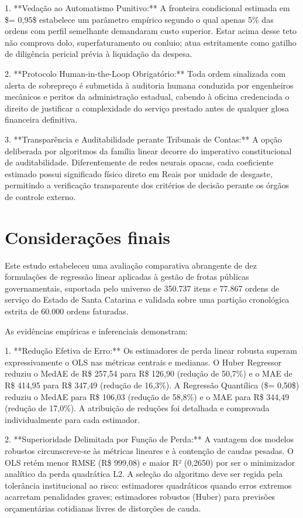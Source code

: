 \documentclass[12pt,a4paper]{article}
\begin{document}
1. **Vedação ao Automatismo Punitivo:** A fronteira condicional estimada em \$\tau = 0,95\$ estabelece um parâmetro empírico segundo o qual apenas 5\% das ordens com perfil semelhante demandaram custo superior. Estar acima desse teto não comprova dolo, superfaturamento ou conluio; atua estritamente como gatilho de diligência pericial prévia à liquidação da despesa.

2. **Protocolo Human-in-the-Loop Obrigatório:** Toda ordem sinalizada com alerta de sobrepreço é submetida à auditoria humana conduzida por engenheiros mecânicos e peritos da administração estadual, cabendo à oficina credenciada o direito de justificar a complexidade do serviço prestado antes de qualquer glosa financeira definitiva.

3. **Transparência e Auditabilidade perante Tribunais de Contas:** A opção deliberada por algoritmos da família linear decorre do imperativo constitucional de auditabilidade. Diferentemente de redes neurais opacas, cada coeficiente estimado possui significado físico direto em Reais por unidade de desgaste, permitindo a verificação transparente dos critérios de decisão perante os órgãos de controle externo.


\section{Considerações finais}

Este estudo estabeleceu uma avaliação comparativa abrangente de dez formulações de regressão linear aplicadas à gestão de frotas públicas governamentais, suportada pelo universo de 350.737 itens e 77.867 ordens de serviço do Estado de Santa Catarina e validada sobre uma partição cronológica estrita de 60.000 ordens faturadas.

As evidências empíricas e inferenciais demonstram:

1. **Redução Efetiva de Erro:** Os estimadores de perda linear robusta superam expressivamente o OLS nas métricas centrais e medianas. O Huber Regressor reduziu o MedAE de R\$ 257,54 para R\$ 126,90 (redução de 50,7\%) e o MAE de R\$ 414,95 para R\$ 347,49 (redução de 16,3\%). A Regressão Quantílica (\$\tau = 0,50\$) reduziu o MedAE para R\$ 106,03 (redução de 58,8\%) e o MAE para R\$ 344,49 (redução de 17,0\%). A atribuição de reduções foi detalhada e comprovada individualmente para cada estimador.

2. **Superioridade Delimitada por Função de Perda:** A vantagem dos modelos robustos circunscreve-se às métricas lineares e à contenção de caudas pesadas. O OLS retém menor RMSE (R\$ 999,08) e maior R² (0,2650) por ser o minimizador analítico da perda quadrática L2. A seleção do algoritmo deve ser regida pela tolerância institucional ao risco: estimadores quadráticos quando erros extremos acarretam penalidades graves; estimadores robustos (Huber) para previsões orçamentárias cotidianas livres de distorções de cauda.
\end{document}
